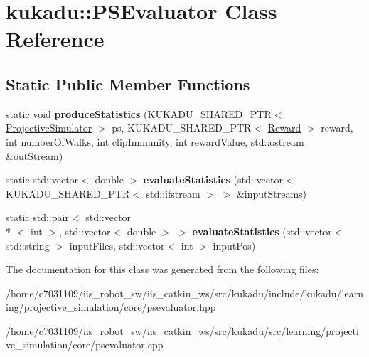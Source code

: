 \hypertarget{classkukadu_1_1PSEvaluator}{\section{kukadu\-:\-:P\-S\-Evaluator Class Reference}
\label{classkukadu_1_1PSEvaluator}
}
\subsection*{Static Public Member Functions}
\begin{DoxyCompactItemize}
\item 
\hypertarget{classkukadu_1_1PSEvaluator_a9ab602bbbf3b4891c9d7803dfe4b9ade}{static void {\bfseries produce\-Statistics} (K\-U\-K\-A\-D\-U\-\_\-\-S\-H\-A\-R\-E\-D\-\_\-\-P\-T\-R$<$ \hyperlink{classkukadu_1_1ProjectiveSimulator}{Projective\-Simulator} $>$ ps, K\-U\-K\-A\-D\-U\-\_\-\-S\-H\-A\-R\-E\-D\-\_\-\-P\-T\-R$<$ \hyperlink{classkukadu_1_1Reward}{Reward} $>$ reward, int number\-Of\-Walks, int clip\-Immunity, int reward\-Value, std\-::ostream \&out\-Stream)}\label{classkukadu_1_1PSEvaluator_a9ab602bbbf3b4891c9d7803dfe4b9ade}

\item 
\hypertarget{classkukadu_1_1PSEvaluator_a65c3411030e5a70d08bd03e87cc8894d}{static std\-::vector$<$ double $>$ {\bfseries evaluate\-Statistics} (std\-::vector$<$ K\-U\-K\-A\-D\-U\-\_\-\-S\-H\-A\-R\-E\-D\-\_\-\-P\-T\-R$<$ std\-::ifstream $>$ $>$ \&input\-Streams)}\label{classkukadu_1_1PSEvaluator_a65c3411030e5a70d08bd03e87cc8894d}

\item 
\hypertarget{classkukadu_1_1PSEvaluator_aff218534a5ddb7d3c7b9c7452ba27015}{static std\-::pair$<$ std\-::vector\\*
$<$ int $>$, std\-::vector$<$ double $>$ $>$ {\bfseries evaluate\-Statistics} (std\-::vector$<$ std\-::string $>$ input\-Files, std\-::vector$<$ int $>$ input\-Pos)}\label{classkukadu_1_1PSEvaluator_aff218534a5ddb7d3c7b9c7452ba27015}

\end{DoxyCompactItemize}


The documentation for this class was generated from the following files\-:\begin{DoxyCompactItemize}
\item 
/home/c7031109/iis\-\_\-robot\-\_\-sw/iis\-\_\-catkin\-\_\-ws/src/kukadu/include/kukadu/learning/projective\-\_\-simulation/core/psevaluator.\-hpp\item 
/home/c7031109/iis\-\_\-robot\-\_\-sw/iis\-\_\-catkin\-\_\-ws/src/kukadu/src/learning/projective\-\_\-simulation/core/psevaluator.\-cpp\end{DoxyCompactItemize}
